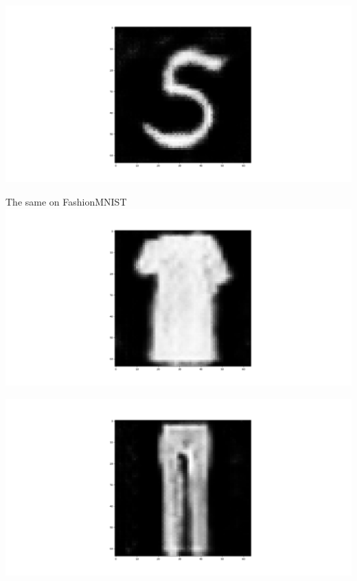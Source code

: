 \documentclass{beamer}
\begin{document}
\begin{frame}
    \centering
    \includegraphics[scale=0.2]{images/gen35with5weighted.png}
\end{frame}

\begin{frame}{The same on FashionMNIST}
    \centering
    \includegraphics[scale=0.2]{images/shirt.png}
\end{frame}

\begin{frame}
    \centering
    \includegraphics[scale=0.2]{images/pants.png}
\end{frame}
\end{document}
